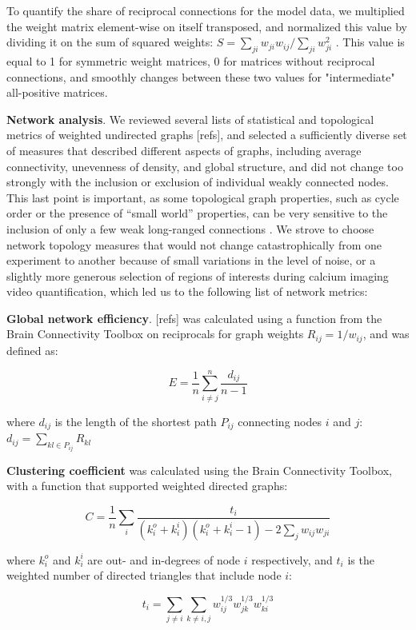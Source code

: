 \documentclass{article}
\begin{document}
To quantify the share of reciprocal connections for the model data, we multiplied the weight matrix element-wise on itself transposed, and normalized this value by dividing it on the sum of squared weights: $S=\sum_{ji}{w_{ji} w_{ij}} / \sum_{ji}{w_{ji}^2}$ . This value is equal to 1 for symmetric weight matrices, 0 for matrices without reciprocal connections, and smoothly changes between these two values for "intermediate" all-positive matrices.

\textbf{Network analysis}. We reviewed several lists of statistical and topological metrics of weighted undirected graphs [refs], and selected a sufficiently diverse set of measures that described different aspects of graphs, including average connectivity, unevenness of density, and global structure, and did not change too strongly with the inclusion or exclusion of individual weakly connected nodes. This last point is important, as some topological graph properties, such as cycle order or the presence of “small world” properties, can be very sensitive to the inclusion of only a few weak long-ranged connections \citep{papo2016beware}. We strove to choose network topology measures that would not change catastrophically from one experiment to another because of small variations in the level of noise, or a slightly more generous selection of regions of interests during calcium imaging video quantification, which led us to the following list of network metrics:

\textbf{Global network efficiency}. [refs] was calculated using a function from the Brain Connectivity Toolbox \citep{rubinov2010toolbox} on reciprocals for graph weights $R_{ij} = 1/w_{ij}$, and was defined as:

\[ E = \frac{1}{n} \sum_{i \neq j}^n{\frac{d_{ij}}{n-1}} \]

where $d_{ij}$ is the length of the shortest path $P_{ij}$ connecting nodes $i$ and $j$: $d_{ij} = \sum_{kl \in P_{ij}}{R_{kl}}$

\textbf{Clustering coefficient} \citep{fagiolo2007} was calculated using the Brain Connectivity Toolbox, with a function that supported weighted directed graphs:

\[ C = \frac{1}{n} \sum_i{\frac {t_i}{(k^o_i+k^i_i)(k^o_i+k^i_i-1)-2\sum_j{w_{ij}w_{ji}}}} \]

where $k^o_i$ and $k^i_i$ are out- and in-degrees of node $i$ respectively, and $t_i$ is the weighted number of directed triangles that include node $i$:

\[ t_i = \sum_{j \neq i}{\sum_{k \neq i,j}{w^{1/3}_{ij}w^{1/3}_{jk}w^{1/3}_{ki}}} \]
\end{document}
